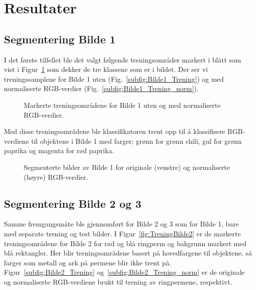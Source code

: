 \documentclass[twocolumn,norwegian]{article}
\begin{document}
	\section{Resultater}
	\subsection{Segmentering Bilde 1}
	I det første tilfellet ble det valgt følgende treningsområder markert i blått som vist i Figur~\ref{fig:TreningBilde1} som dekker de tre klassene som er i bildet. Der ser vi treningssamplene for Bilde 1 uten (Fig.~\ref{subfig:Bilde1_Trening}) og med normaliserte RGB-verdier (Fig.~\ref{subfig:Bilde1_Trening_norm}).

	\begin{figure}[ht!]
		\centering
		\caption{Markerte treningsområdene for Bilde 1 uten og med normaliserte RGB-verdier. \label{fig:TreningBilde1}}
	\end{figure}

	Med disse treningsområdene ble klassifikatoren trent opp til å klassifisere RGB-verdiene til objektene i Bilde 1 med farger; grønn for grønn chili, gul for grønn paprika og magenta for rød paprika.
	
	\begin{figure}[ht!]
		\centering
		\caption{Segmenterte bilder av Bilde 1 for originale (venstre) og normaliserte (høyre) RGB-verdier. \label{fig:TestBilde1}}
	\end{figure}

	\subsection{Segmentering Bilde 2 og 3}
	Samme fremgangsmåte ble gjennomført for Bilde 2 og 3 som for Bilde 1, bare med separate trening og test bilder. I Figur~\ref{fig:TreningBilde2} er de markerte treningsområdene for Bilde 2 for rød og blå ringperm og bakgrunn markert med blå rektangler. Her blir treningsområdene basert på hovedfargene til objektene, så farger som metall og ark på permene blir ikke trent på. Figur~\ref{subfig:Bilde2_Trening} og~\ref{subfig:Bilde2_Trening_norm} er de originale og normaliserte RGB-verdiene brukt til trening av ringpermene, respektivt.
	
\end{document}
